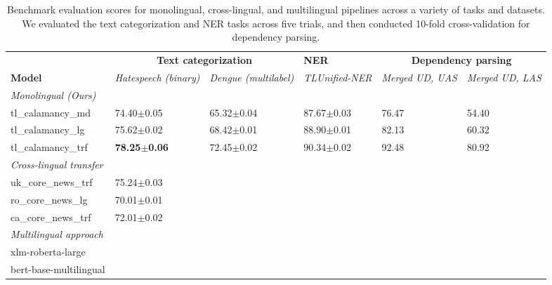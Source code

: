 \documentclass[../emnlp2023.tex]{subfiles}
\begin{document}
\begin{table*}[t]
\begin{tabular}{@{}p{4cm}p{2cm}p{2cm}p{2cm}p{2cm}p{2cm}@{}}
\toprule
                           & \multicolumn{2}{c}{\textbf{Text categorization}} & \textbf{NER} & \multicolumn{2}{c}{\textbf{Dependency parsing}}                         \\ 
\textbf{Model}             & \textit{Hatespeech (binary)} & \textit{Dengue (multilabel)} & \textit{TLUnified-NER} & \textit{Merged UD, UAS} & \textit{Merged UD, LAS} \\ \midrule 
\textit{Monolingual (Ours)}              \\
tl\_calamancy\_md   & 74.40$\pm$0.05 & 65.32$\pm$0.04 & 87.67$\pm$0.03 & 76.47 & 54.40\\
tl\_calamancy\_lg   & 75.62$\pm$0.02 & 68.42$\pm$0.01 & 88.90$\pm$0.01 & 82.13 & 60.32\\
tl\_calamancy\_trf  & \textbf{78.25$\pm$0.06} & 72.45$\pm$0.02 & 90.34$\pm$0.02 & 92.48 & 80.92\\ \midrule
\textit{Cross-lingual transfer} \\
uk\_core\_news\_trf & 75.24$\pm$0.03 \\
ro\_core\_news\_lg  & 70.01$\pm$0.01 \\
ca\_core\_news\_trf & 72.01$\pm$0.02 \\ \midrule
\textit{Multilingual approach} \\
xlm-roberta-large \\
bert-base-multilingual \\
\bottomrule
\end{tabular}
\caption{
    Benchmark evaluation scores for monolingual, cross-lingual, and multilingual pipelines across a variety of tasks and datasets.
    We evaluated the text categorization and NER tasks across five trials, and then conducted 10-fold cross-validation for dependency parsing.
}
\label{table:results}
\end{table*}
\end{document}
